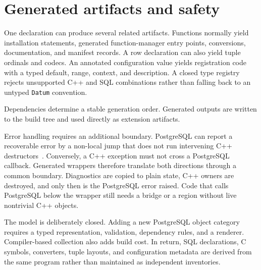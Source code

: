 \section{Generated artifacts and safety}
\label{sec:sql-codegen-artifacts}

One declaration can produce several related artifacts. Functions normally
yield installation statements, generated function-manager entry points,
conversions, documentation, and manifest records. A row declaration can also
yield tuple ordinals and codecs. An annotated configuration value yields
registration code with a typed default, range, context, and description. A
closed type registry rejects unsupported C++ and SQL combinations rather than
falling back to an untyped \texttt{Datum} convention.

Dependencies determine a stable generation order. Generated outputs are
written to the build tree and used directly as extension artifacts.

Error handling requires an additional boundary. PostgreSQL can report a
recoverable error by a non-local jump that does not run intervening C++
destructors~\cite{postgresql17_cpp_extensibility}. Conversely, a C++ exception
must not cross a PostgreSQL callback. Generated wrappers therefore translate
both directions through a common boundary. Diagnostics are copied to plain
state, C++ owners are destroyed, and only then is the PostgreSQL error raised.
Code that calls PostgreSQL below the wrapper still needs a bridge or a region
without live nontrivial C++ objects.

The model is deliberately closed. Adding a new PostgreSQL object category
requires a typed representation, validation, dependency rules, and a renderer.
Compiler-based collection also adds build cost. In return, SQL declarations,
C symbols, converters, tuple layouts, and configuration metadata are derived
from the same program rather than maintained as independent inventories.
